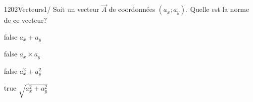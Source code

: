         	\begin{question}{1202}{Vecteurs}{1}{/}
				Soit un vecteur $\vec{A}$ de coordonnées $(a_x;a_y)$. Quelle est la norme de ce vecteur?
            \end{question}
            \begin{reponses}
            	\item[false] $a_x+a_y$
            	\item[false] $a_x\times a_y$
                \item[false] $a_{x}^2+a_{y}^2$
                \item[true] $\sqrt{a_{x}^2+a_{y}^2}$
            \end{reponses}
